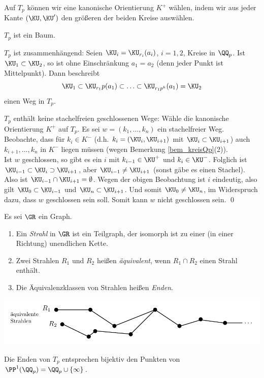 Auf $T_p$ können wir eine kanonische Orientierung $K^+$ wählen,
indem wir aus jeder Kante $(\KU,\KU')$ den größeren der beiden Kreise
auswählen.

\BEM $T_p$ ist ein Baum.

\bew $T_p$ ist zusammenhängend: Seien $\KU_i=\KU_{r_i}(a_i)$, $i=1,2$,
Kreise in $\QQ_p$. Ist $\KU_1\subset \KU_2$, so ist ohne Einschränkung
$a_1=a_2$ (denn jeder Punkt ist Mittelpunkt). Dann beschreibt
\[
\KU_1 \subset \KU_{r_1}p(a_1) \subset \ldots \subset
\KU_{r_1 p^k}(a_1)=\KU_2
\]
einen Weg in $T_p$.

$T_p$ enthält keine stachelfreien geschlossenen Wege: Wähle die
kanonische Orientierung $K^+$ auf $T_p$.
Es sei $w=(k_1,\ldots,k_n)$ ein stachelfreier Weg.
Beobachte, dass für $k_i\in K^-$ (d.h. $k_i=(\KU_i,\KU_{i+1})$
mit $\KU_i\subset \KU_{i+1}$) auch $k_{i+1},\ldots,k_n$ in $K^-$
liegen müssen (wegen Bemerkung \ref{bem_kreisQp}(2)).\\
Ist $w$ geschlossen, so gibt es ein $i$ mit $k_{i-1}\in\KU^+$ und
$k_i\in\KU^-$.
Folglich ist $\KU_{i-1}\subset \KU_i \supset \KU_{i+1}$, aber
$\KU_{i-1}\neq\KU_{i+1}$ (sonst gäbe es einen Stachel).
Also ist $\KU_{i-1}\cap \KU_{i+1}=\emptyset$. Wegen der obigen
Beobachtung ist $i$ eindeutig, also gilt
$\KU_0\subset \KU_{i-1}$ und $\KU_n\subset \KU_{i+1}$.
Und somit $\KU_0\neq \KU_n$, im Widerspruch dazu, dass $w$ geschlossen
sein soll. Somit kann $w$ nicht geschlossen sein.
\qed

\DEF Es sei $\GR$ ein Graph.
\begin{enumerate}
\item Ein \emph{Strahl} in $\GR$ ist ein Teilgraph,
der isomorph ist zu einer (in einer Richtung) unendlichen Kette.
\item Zwei Strahlen $R_1$ und $R_2$ heißen \emph{äquivalent},
wenn $R_1\cap R_2$ einen Strahl enthält.
\item Die Äquivalenzklassen von Strahlen heißen \emph{Enden}.
\end{enumerate}
\begin{center}
	\includegraphics{grugraImages/R1R2}
\end{center}

\PROP Die Enden von $T_p$ entsprechen bijektiv den Punkten von
$\PP^1(\QQ_p)=\QQ_p\cup\{\infty\}$.

